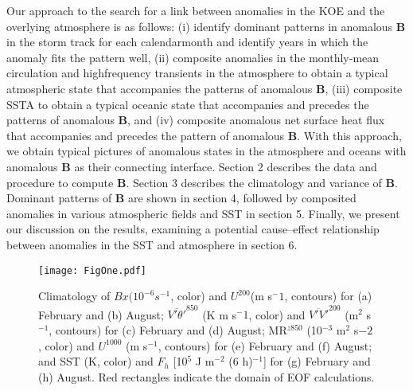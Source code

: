 \documentclass[twocol]{ametsocV5}
\begin{document}
Our approach to the search for a link between anomalies
in the KOE and the overlying atmosphere is as follows:
(i) identify dominant patterns in anomalous $\mathbf{B}$ in the
storm track for each calendarmonth and identify years in
which the anomaly fits the pattern well, (ii) composite
anomalies in the monthly-mean circulation and highfrequency
transients in the atmosphere to obtain a typical
atmospheric state that accompanies the patterns of
anomalous $\mathbf B$, (iii) composite SSTA to obtain a typical
oceanic state that accompanies and precedes the patterns
of anomalous $\mathbf B$, and (iv) composite anomalous net surface
heat flux that accompanies and precedes the pattern of
anomalous $\mathbf B$. With this approach, we obtain typical pictures
of anomalous states in the atmosphere and oceans
with anomalous $\mathbf{B}$ as their connecting interface.
Section 2 describes the data and procedure to compute
$\mathbf B$. Section 3 describes the climatology and variance of $\mathbf B$.
Dominant patterns of $\mathbf B$ are shown in section 4, followed by
composited anomalies in various atmospheric fields and
SST in section 5. Finally, we present our discussion on the
results, examining a potential cause--effect relationship
between anomalies in the SST and atmosphere in section 6.

\begin{figure*}[t]
\centerline{\texttt{[image: FigOne.pdf]}}

\caption{Climatology of $Bx (10^{-6} s^{-1}$, color) and $U^{200}$(m s$^-1$,
contours) for (a) February and (b) August; $\overline{V'\theta'}^{850}$
(K m s$^-1$, color) and 
$\overline{V'V'}^{200}$
(m$^2$ s$^{-1}$, contours) for (c) February and (d) August; MR$^{z850}$ 
(10$^{-3}$ m$^2$ s$-2$, color) and $U^{1000}$ (m s$^{-1}$, contours) 
for (e) February and (f) August;
and SST (K, color) and $F_h$ [10$^5$ J m$^{-2}$ (6 h)$^{-1}$] for (g)
February and (h) August. Red rectangles indicate the domain of EOF
calculations.} \label{fig1}
\end{figure*}
\end{document}
